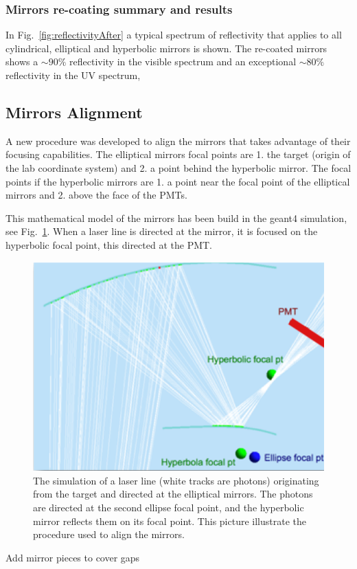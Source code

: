 \subsubsection{Mirrors re-coating summary and results}

In Fig.~\ref{fig:reflectivityAfter} a typical spectrum of reflectivity that applies to all cylindrical, elliptical and hyperbolic mirrors is shown.
The re-coated mirrors shows a $\sim 90\%$ reflectivity in the visible spectrum and an exceptional $\sim 80\%$
reflectivity in the UV spectrum,

\subsection{Mirrors Alignment}

A new procedure was developed to align the mirrors that takes advantage of their focusing capabilities. The elliptical mirrors focal points are 1. the target
(origin of the lab coordinate system)
and 2. a point behind the hyperbolic mirror. The focal points if the hyperbolic mirrors are 1. a point near the focal point of the elliptical mirrors and
2. above the face of the PMTs.

This mathematical model of the mirrors has been build in the geant4 simulation, see Fig.~\ref{fig:alignmentSimulation}. When a laser line is directed at the mirror,
it is focused on the hyperbolic focal point, this directed at the PMT.


\begin{figure}[h]
\centering
	\includegraphics[width=1.0\columnwidth, keepaspectratio]{img/mirrorAlignmentSimulationZoomed.png}
	\caption{The simulation of a laser line (white tracks are photons) originating from the target and directed at the elliptical mirrors. The photons are directed
		      at the second ellipse focal point, and the hyperbolic mirror reflects them on its focal point. This picture illustrate the procedure used to align the mirrors.}
	\label{fig:alignmentSimulation}
\end{figure}



Add mirror pieces to cover gaps
